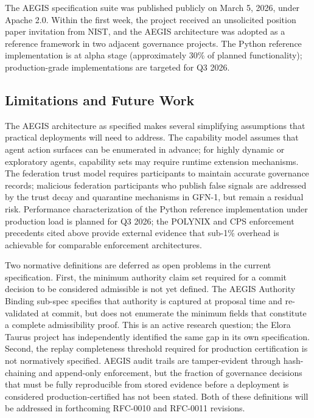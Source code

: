 \documentclass{IEEEcsmag}
\begin{document}
The AEGIS specification suite was published publicly on March 5, 2026, under Apache 2.0. Within the first week, the project received an unsolicited position paper invitation from NIST, and the AEGIS architecture was adopted as a reference framework in two adjacent governance projects. The Python reference implementation is at alpha stage (approximately 30\% of planned functionality); production-grade implementations are targeted for Q3 2026.

\subsection{Limitations and Future Work}

The AEGIS architecture as specified makes several simplifying assumptions that practical deployments will need to address. The capability model assumes that agent action surfaces can be enumerated in advance; for highly dynamic or exploratory agents, capability sets may require runtime extension mechanisms. The federation trust model requires participants to maintain accurate governance records; malicious federation participants who publish false signals are addressed by the trust decay and quarantine mechanisms in GFN-1, but remain a residual risk. Performance characterization of the Python reference implementation under production load is planned for Q3 2026; the POLYNIX and CPS enforcement precedents cited above provide external evidence that sub-1\% overhead is achievable for comparable enforcement architectures.

Two normative definitions are deferred as open problems in the current specification. First, the minimum authority claim set required for a commit decision to be considered admissible is not yet defined. The AEGIS Authority Binding sub-spec specifies that authority is captured at proposal time and re-validated at commit, but does not enumerate the minimum fields that constitute a complete admissibility proof. This is an active research question; the Elora Taurus project has independently identified the same gap in its own specification. Second, the replay completeness threshold required for production certification is not normatively specified. AEGIS audit trails are tamper-evident through hash-chaining and append-only enforcement, but the fraction of governance decisions that must be fully reproducible from stored evidence before a deployment is considered production-certified has not been stated. Both of these definitions will be addressed in forthcoming RFC-0010 and RFC-0011 revisions.
\end{document}
